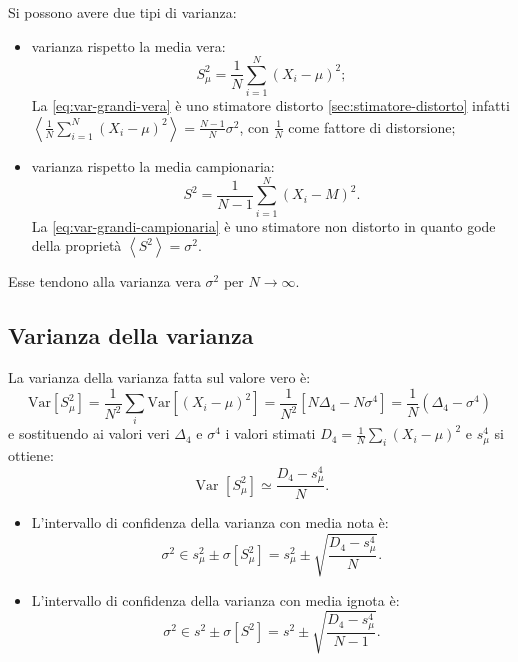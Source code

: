 Si possono avere due tipi di varianza:
\begin{itemize}
\item varianza rispetto la media vera:
\begin{equation}
\label{eq:var-grandi-vera}
{ S }_{ \mu  }^{ 2 }=\frac { 1 }{ N } \sum _{ i=1 }^{ N }{ \left( { X }_{ i }-\mu  \right) ^{ 2 } } ;
\end{equation}
La \ref{eq:var-grandi-vera} è uno stimatore distorto \ref{sec:stimatore-distorto} infatti $\left< \frac { 1 }{ N } \sum _{ i=1 }^{ N }{ \left( { X }_{ i }-\mu  \right) ^{ 2 } }  \right> =\frac { N-1 }{ N } \sigma ^{ 2 }$, con $\frac{1}{N}$ come fattore di distorsione;
\item varianza rispetto la media campionaria:
\begin{equation}
\label{eq:var-grandi-campionaria}
{ S }^{ 2 }=\frac { 1 }{ N-1 } \sum _{ i=1 }^{ N }{ \left( { X }_{ i }-M \right) ^{ 2 } }.
\end{equation}
La \ref{eq:var-grandi-campionaria} è uno stimatore non distorto in quanto gode della proprietà $\left< S^{ 2 } \right> =\sigma ^{ 2 }$.
\end{itemize}
Esse tendono alla varianza vera $\sigma^2$ per $N\rightarrow \infty$.

\subsection{Varianza della varianza}
\label{subsec:varianza-varianza}
La varianza della varianza fatta sul valore vero è:
\begin{equation}
\textrm{Var}\left[ { S }_{ \mu  }^{ 2 } \right] =\frac { 1 }{ N^{ 2 } } \sum _{ i }{ \textrm{Var}\left[ { \left( { X }_{ i }-\mu  \right)  }^{ 2 } \right]  } =\frac { 1 }{ N^{ 2 } } \left[ N{ \Delta  }_{ 4 }-N{ \sigma  }^{ 4 } \right] =\frac { 1 }{ N } \left( { \Delta  }_{ 4 }-{ \sigma  }^{ 4 } \right) 
\end{equation}
e sostituendo ai valori veri $\Delta_4$ e $\sigma^4$ i valori stimati ${ D }_{ 4 }=\frac { 1 }{ N } \sum _{ i }{ { \left( { X }_{ i }-\mu  \right)  }^{ 2 } } $ e $s^4_\mu$ si ottiene:
\begin{equation}
\textrm{ Var }\left[ { S }_{ \mu  }^{ 2 } \right] \simeq \frac { D_{ 4 }-s^{ 4 }_{ \mu  } }{ N } .
\end{equation}
\begin{itemize}
\item L'intervallo di confidenza della varianza con media nota è:
\begin{equation}
\sigma ^{ 2 }\in s^{ 2 }_{ \mu  }\pm \sigma \left[ { S }_{ \mu  }^{ 2 } \right] =s^{ 2 }_{ \mu  }\pm \sqrt { \frac { D_{ 4 }-s^{ 4 }_{ \mu  } }{ N }  }.
\end{equation}
\item L'intervallo di confidenza della varianza con media ignota è:
\begin{equation}
\sigma ^{ 2 }\in s^{ 2 }\pm \sigma \left[ { S }^{ 2 } \right] =s^{ 2 }\pm \sqrt { \frac { D_{ 4 }-s^{ 4 }_{ \mu  } }{ N-1 }  } .
\end{equation}
\end{itemize}

